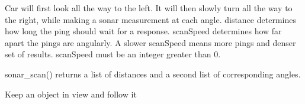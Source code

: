 \documentclass[letterpaper,10pt,english]{sphinxmanual}
\begin{document}
\begin{fulllineitems}
\begin{fulllineitems}
Car will first look all the way to the left. It will then slowly turn all the way to the right, while making a sonar measurement at each angle.
distance determines how long the ping should wait for a response.
scanSpeed determines how far apart the pings are angularly. A slower scanSpeed means more pings and denser set of results. scanSpeed must be an integer greater than 0.

sonar\_scan() returns a list of distances and a second list of corresponding angles.

\end{fulllineitems}


\begin{fulllineitems}
\label{\detokenize{index:picar.PiCar.track_object}}
Keep an object in view and follow it

\end{fulllineitems}


\end{fulllineitems}

\end{document}
